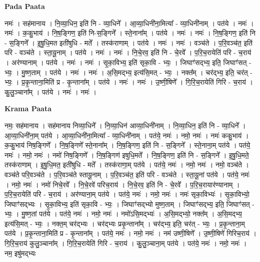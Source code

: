 \documentclass[17pt]{extarticle}
\begin{document}
\textbf{Pada Paata} \newline

नमः॑ । सह॑मानाय । नि॒व्या॒धिन॒ इति॑ नि - व्या॒धिने᳚ । आ॒व्या॒धिनी॑ना॒मित्या᳚ - व्या॒धिनी॑नाम् । पत॑ये । नमः॑ । नमः॑ । क॒कु॒भाय॑ । नि॒ष॒ङ्गिण॒ इति॑ नि-स॒ङ्गिने᳚ । स्ते॒नाना᳚म् । पत॑ये । नमः॑ । नमः॑ । नि॒ष॒ङ्गिण॒ इति॑ नि - स॒ङ्गिने᳚ । इ॒षु॒धि॒मत इती॑षुधि - मते᳚ । तस्क॑राणाम् । पत॑ये । नमः॑ । नमः॑ । वञ्च॑ते । प॒रि॒वञ्च॑त॒ इति॑ परि - वञ्च॑ते । स्ता॒यू॒नाम् । पत॑ये । नमः॑ । नमः॑ । नि॒चे॒रव॒ इति॑ नि - चे॒रवे᳚ । प॒रि॒च॒रायेति॑ परि - च॒राय॑ । अर॑ण्यानाम् । पत॑ये । नमः॑ । नमः॑ । सृ॒का॒विभ्य॒ इति॑ सृका॒वि - भ्यः॒ । जिघाꣳ॑सद्भ्य॒ इति॒ जिघाꣳ॑सत् - भ्यः॒ । मु॒ष्ण॒ताम् । पत॑ये । नमः॑ । नमः॑ । अ॒सि॒मद्भ्य॒ इत्य॑सि॒मत् - भ्यः॒ । नक्त᳚म् । चर॑द्भ्य॒ इति॒ चर॑त् - भ्यः॒ । प्र॒कृ॒न्ताना॒मिति॑ प्र - कृ॒न्ताना᳚म् । पत॑ये । नमः॑ । नमः॑ । उ॒ष्णी॒षिणे᳚ । गि॒रि॒च॒रायेति॑ गिरि - च॒राय॑ । कु॒लु॒ञ्चाना᳚म् । पत॑ये । नमः॑ । नमः॑ ।  \newline


\textbf{Krama Paata} \newline

नमः॒ सह॑मानाय । सह॑मानाय निव्या॒धिने᳚ । नि॒व्या॒धिन॑ आव्या॒धिनी॑नाम् । नि॒व्या॒धिन॒ इति॑ नि - व्या॒धिने᳚ । आ॒व्या॒धिनी॑ना॒म् पत॑ये । आ॒व्या॒धिनी॑ना॒मित्या᳚ - व्या॒धिनी॑नाम् । पत॑ये॒ नमः॑ । नमो॒ नमः॑ । नमः॑ ककु॒भाय॑ । क॒कु॒भाय॑ निष॒ङ्गिणे᳚ । नि॒ष॒ङ्गिणे᳚ स्ते॒नाना᳚म् । नि॒ष॒ङ्गिण॒ इति॑ नि - स॒ङ्गिने᳚ । स्ते॒नाना॒म् पत॑ये । पत॑ये॒ नमः॑ । नमो॒ नमः॑ । नमो॑ निष॒ङ्गिणे᳚ । नि॒ष॒ङ्गिण॑ इषुधि॒मते᳚ । नि॒ष॒ङ्गिण॒ इति॑ नि - स॒ङ्गिने᳚ । इ॒षु॒धि॒मते॒ तस्क॑राणाम् । इ॒षु॒धि॒मत॒ इती॑षुधि - मते᳚ । तस्क॑राणा॒म् पत॑ये । पत॑ये॒ नमः॑ । नमो॒ नमः॑ । नमो॒ वञ्च॑ते । वञ्च॑ते परि॒वञ्च॑ते । प॒रि॒वञ्च॑ते स्तायू॒नाम् । प॒रि॒वञ्च॑त॒ इति॑ परि - वञ्च॑ते । स्ता॒यू॒नां पत॑ये । पत॑ये॒ नमः॑ । नमो॒ नमः॑ । नमो॑ निचे॒रवे᳚ । नि॒चे॒रवे॑ परिच॒राय॑ । नि॒चे॒रव॒ इति॑ नि - चे॒रवे᳚ । प॒रि॒च॒रायार॑ण्यानाम् । प॒रि॒च॒रायेति॑ परि - च॒राय॑ । अर॑ण्याना॒म् पत॑ये । पत॑ये॒ नमः॑ । नमो॒ नमः॑ । नमः॑ सृका॒विभ्यः॑ । सृ॒का॒विभ्यो॒ जिघाꣳ॑सद्भ्यः । सृ॒का॒विभ्य॒ इति॑ सृका॒वि - भ्यः॒ । जिघाꣳ॑सद्भ्यो मुष्ण॒ताम् । जिघाꣳ॑सद्भ्य॒ इति॒ जिघाꣳ॑सत् - भ्यः॒ । मु॒ष्ण॒तां पत॑ये । पत॑ये॒ नमः॑ । नमो॒ नमः॑ । नमो॑ऽसि॒मद्भ्यः॑ । अ॒सि॒मद्भ्यो॒ नक्त᳚म् । अ॒सि॒मद्भ्य॒ इत्य॑सि॒मत् - भ्यः॒ । नक्त॒म् चर॑द्भ्यः । चर॑द्भ्यः प्रकृ॒न्ताना᳚म् । चर॑द्भ्य॒ इति॒ चर॑त् - भ्यः॒ । प्र॒कृ॒न्ताना॒म् पत॑ये । प्र॒कृ॒न्ताना॒मिति॑ प्र - कृ॒न्ताना᳚म् । पत॑ये॒ नमः॑ । नमो॒ नमः॑ । नम॑ उष्णी॒षिणे᳚ । उ॒ष्णी॒षिणे॑ गिरिच॒राय॑ । गि॒रि॒च॒राय॑ कुलु॒ञ्चाना᳚म् । गि॒रि॒च॒रायेति॑ गिरि - च॒राय॑ । कु॒लु॒ञ्चाना॒म् पत॑ये । पत॑ये॒ नमः॑ । नमो॒ नमः॑ । नम॒ इषु॑मद्भ्यः \newline
\end{document}
